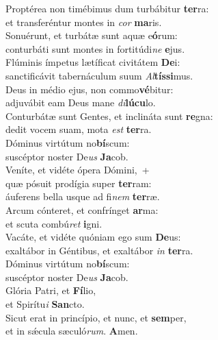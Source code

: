 \evenverse Proptérea non timébimus dum turbábitur \textbf{ter}ra:~\*\\
\evenverse et transferéntur montes in \textit{cor} \textbf{ma}ris.\\
\oddverse Sonuérunt, et turbátæ sunt aquæ e\textbf{ó}rum:~\*\\
\oddverse conturbáti sunt montes in fortitúdi\textit{ne} \textbf{e}jus.\\
\evenverse Flúminis ímpetus lætíficat civitátem \textbf{De}i:~\*\\
\evenverse sanctificávit tabernáculum suum \textit{Al}\textbf{tís}\textbf{si}mus.\\
\oddverse Deus in médio ejus, non commo\textbf{vé}bitur:~\*\\
\oddverse adjuvábit eam Deus mane \textit{di}\textbf{lú}\textbf{cu}lo.\\
\evenverse Conturbátæ sunt Gentes, et inclináta sunt \textbf{re}gna:~\*\\
\evenverse dedit vocem suam, mota \textit{est} \textbf{ter}ra.\\
\oddverse Dóminus virtútum no\textbf{bí}scum:~\*\\
\oddverse suscéptor noster De\textit{us} \textbf{Ja}cob.\\
\evenverse Veníte, et vidéte ópera Dómini,~+\\
\evenverse  quæ pósuit prodígia super \textbf{ter}ram:~\*\\
\evenverse áuferens bella usque ad fi\textit{nem} \textbf{ter}ræ.\\
\oddverse Arcum cónteret, et confrínget \textbf{ar}ma:~\*\\
\oddverse et scuta combú\textit{ret} \textbf{i}gni.\\
\evenverse Vacáte, et vidéte quóniam ego sum \textbf{De}us:~\*\\
\evenverse exaltábor in Géntibus, et exaltábor \textit{in} \textbf{ter}ra.\\
\oddverse Dóminus virtútum no\textbf{bí}scum:~\*\\
\oddverse suscéptor noster De\textit{us} \textbf{Ja}cob.\\
\evenverse Glória Patri, et \textbf{Fí}lio,~\*\\
\evenverse et Spirítu\textit{i} \textbf{San}cto.\\
\oddverse Sicut erat in princípio, et nunc, et \textbf{sem}per,~\*\\
\oddverse et in sǽcula sæculó\textit{rum}. \textbf{A}men.\\
